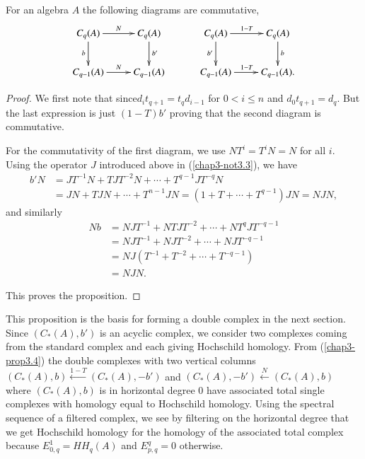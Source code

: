 \begin{proposition}\label{chap3-prop3.4}
For an algebra $A$ the following diagrams are commutative,
\[
\xymatrix{
C_{q}(A)\ar[d]_{b} \ar[r]^{N} & C_{q}(A)\ar[d]^{b'}\\
C_{q-1}(A)\ar[r]^{N} & C_{q-1}(A) 
}
\qquad\quad
\xymatrix{
C_{q}(A)\ar[d]_{b'}\ar[r]^{1-T} & C_{q}(A)\ar[d]^{b}\\
C_{q-1}(A)\ar[r]^{1-T} & C_{q-1}(A).
}
\]
\end{proposition}

\begin{proof}
We first note that
{}
since\pageoriginale $d_{i}t_{q+1}=t_{q}d_{i-1}$ for $0<i\leq n$ and
$d_{0}t_{q+1}=d_{q}$. But the last expression is just $(1-T)b'$
proving that the second diagram is commutative.

For the commutativity of the first diagram, we use $NT^{i}=T^{i}N=N$
for all $i$. Using the operator $J$ introduced above in
(\ref{chap3-not3.3}), we have
\begin{align*}
b'N &= JT^{-1}N+TJT^{-2}N+\cdots+T^{q-1}JT^{-q}N\\
&= JN+TJN+\cdots+T^{n-1}JN=(1+T+\cdots+T^{q-1})JN=NJN,
\end{align*}
and similarly
\begin{align*}
Nb &= NJT^{-1}+NTJT^{-2}+\cdots+NT^{q}JT^{-q-1}\\
&=
NJT^{-1}+NJT^{-2}+\cdots+NJT^{-q-1}\\
&=NJ(T^{-1}+T^{-2}+\cdots+T^{-q-1})\\
&=NJN.
\end{align*}

This proves the proposition.
\end{proof}

\begin{remark}\label{chap3-rem3.5}
This proposition is the basis for forming a double complex in the next
section. Since $(C_{\ast}(A),b')$ is an acyclic complex, we consider
two complexes coming from the standard complex and each giving
Hochschild homology. From (\ref{chap3-prop3.4}) the double complexes
with two vertical columns
$(C_{\ast}(A),b)\xleftarrow{1-T}(C_{\ast}(A),-b')$ and
$(C_{\ast}(A),-b')\xleftarrow{N}(C_{\ast}(A),b)$ where
$(C_{\ast}(A),b)$ is in horizontal degree $0$ have associated total
single complexes with homology equal to Hochschild homology. Using the
spectral sequence of a filtered complex, we see by filtering on the
horizontal degree that we get Hochschild homology for the homology of
the associated total complex because $E^{1}_{0,q}=HH_{q}(A)$ and
$E^{q}_{p,q}=0$ otherwise.
\end{remark}

